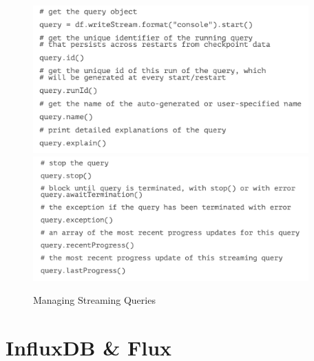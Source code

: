 \documentclass[10pt,a4paper]{article}
\begin{document}
 \pagebreak
      \begin{figure}[ht!]
 \hfill \includegraphics[width=300pt]{images/spark-streaming-queries1}
 \hspace*{\fill}
 \center 
  \hfill \includegraphics[width=300pt]{images/spark-streaming-queries2}
 \hspace*{\fill}
 \caption{Managing Streaming Queries}
 \end{figure} 

\pagebreak
\section{InfluxDB \& Flux}
\end{document}
